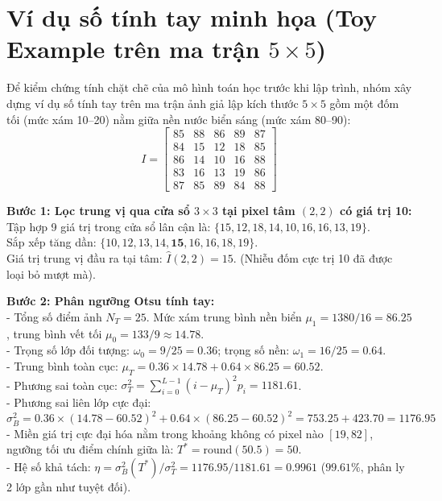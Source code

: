 \section{Ví dụ số tính tay minh họa (Toy Example trên ma trận $5 \times 5$)}
\label{sec:toy_example}
Để kiểm chứng tính chặt chẽ của mô hình toán học trước khi lập trình, nhóm xây dựng ví dụ số tính tay trên ma trận ảnh giả lập kích thước $5 \times 5$ gồm một đốm tối (mức xám 10--20) nằm giữa nền nước biển sáng (mức xám 80--90):
\begin{equation}
    I = \begin{bmatrix}
    85 & 88 & 86 & 89 & 87 \\
    84 & 15 & 12 & 18 & 85 \\
    86 & 14 & 10 & 16 & 88 \\
    83 & 16 & 13 & 19 & 86 \\
    87 & 85 & 89 & 84 & 88
    \end{bmatrix}
\end{equation}

\textbf{Bước 1: Lọc trung vị qua cửa sổ $3 \times 3$ tại pixel tâm $(2, 2)$ có giá trị 10:}\\
Tập hợp 9 giá trị trong cửa sổ lân cận là: $\{15, 12, 18, 14, 10, 16, 16, 13, 19\}$.\\
Sắp xếp tăng dần: $\{10, 12, 13, 14, \mathbf{15}, 16, 16, 18, 19\}$.\\
Giá trị trung vị đầu ra tại tâm: $\hat{I}(2, 2) = 15$. (Nhiễu đốm cực trị 10 đã được loại bỏ mượt mà).

\textbf{Bước 2: Phân ngưỡng Otsu tính tay:}\\
- Tổng số điểm ảnh $N_T = 25$. Mức xám trung bình nền biển $\mu_1 = 1380 / 16 = 86.25$, trung bình vết tối $\mu_0 = 133 / 9 \approx 14.78$.\\
- Trọng số lớp đối tượng: $\omega_0 = 9/25 = 0.36$; trọng số nền: $\omega_1 = 16/25 = 0.64$.\\
- Trung bình toàn cục: $\mu_T = 0.36 \times 14.78 + 0.64 \times 86.25 = 60.52$.\\
- Phương sai toàn cục: $\sigma_T^2 = \sum_{i=0}^{L-1} (i - \mu_T)^2 p_i = 1181.61$.\\
- Phương sai liên lớp cực đại:
\begin{equation}
    \sigma_B^2 = 0.36 \times (14.78 - 60.52)^2 + 0.64 \times (86.25 - 60.52)^2 = 753.25 + 423.70 = 1176.95
\end{equation}
- Miền giá trị cực đại hóa nằm trong khoảng không có pixel nào $[19, 82]$, ngưỡng tối ưu điểm chính giữa là: $T^* = \text{round}(50.5) = 50$.\\
- Hệ số khả tách: $\eta = \sigma_B^2(T^*) / \sigma_T^2 = 1176.95 / 1181.61 = 0.9961$ ($99.61\%$, phân ly 2 lớp gần như tuyệt đối).

